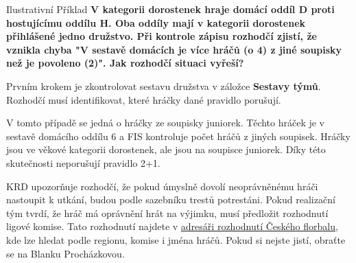 \documentclass{newsletter_2025}
\begin{document}
\begin{admonition-info}{Ilustrativní Příklad}
	\textbf{V kategorii dorostenek hraje domácí oddíl D proti hostujícímu oddílu H. Oba oddíly mají v kategorii dorostenek přihlášené jedno družstvo. Při kontrole zápisu rozhodčí zjistí, že vznikla chyba "V sestavě domácích je více hráčů (o 4) z jiné soupisky než je povoleno (2)". Jak rozhodčí situaci vyřeší?}
	
	\vspace{\baselineskip}
	Prvním krokem je zkontrolovat sestavu družstva v záložce \textbf{Sestavy týmů}. Rozhodčí musí identifikovat, které hráčky dané pravidlo porušují.
	
	\endgroup
	
	V tomto případě se jedná o hráčky ze soupisky juniorek. Těchto hráček je v sestavě domácího oddílu 6 a FIS kontroluje počet hráčů z jiných soupisek. Hráčky jsou ve věkové kategorii dorostenek, ale jsou na soupisce juniorek. Díky této skutečnosti neporušují pravidlo 2+1.
\end{admonition-info}

KRD upozorňuje rozhodčí, že pokud úmyslně dovolí neoprávněnému hráči nastoupit k utkání, budou podle sazebníku trestů potrestáni. Pokud realizační tým tvrdí, že hráč má oprávnění hrát na výjimku, musí předložit rozhodnutí ligové komise. Tato rozhodnutí najdete v \href{https://www.ceskyflorbal.cz/directory/decisions/}{adresáři rozhodnutí Českého florbalu}, kde lze hledat podle regionu, komise i jména hráčů. Pokud si nejste jistí, obraťte se na Blanku Procházkovou.
\end{document}
